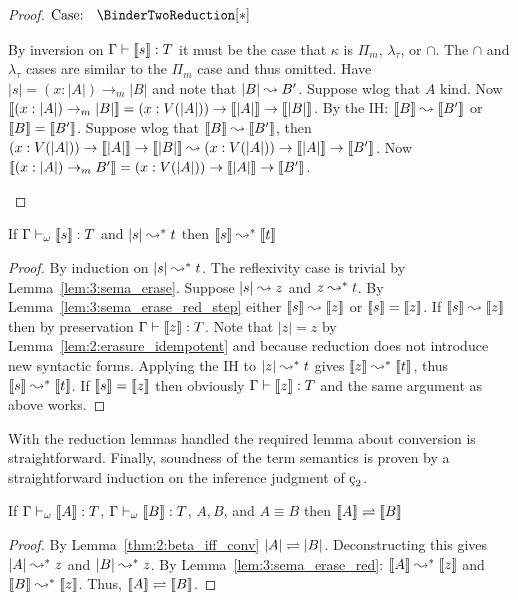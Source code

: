 \begin{proof}
    $\text{Case: }\begin{array}{c} \BinderTwoReduction[*] \end{array}$
    \begin{proofcase}
        By inversion on $\Gamma \vdash \llbracket s \rrbracket : T$ it must be the case that $\kappa$ is $\Pi_m$, $\lambda_\tau$, or $\cap$.
        The $\cap$ and $\lambda_\tau$ cases are similar to the $\Pi_m$ case and thus omitted.
        Have $|s| = (x : |A|) \to_m |B|$ and note that $|B| \leadsto B^\prime$.
        Suppose wlog that $A$ kind.
        Now $\llbracket (x : |A|) \to_m |B| \rrbracket = (x : V(|A|)) \to \llbracket |A| \rrbracket \to \llbracket |B| \rrbracket$.
        By the IH: $\llbracket B \rrbracket \leadsto \llbracket B^\prime \rrbracket$ or $\llbracket B \rrbracket = \llbracket B^\prime \rrbracket$.
        Suppose wlog that $\llbracket B \rrbracket \leadsto \llbracket B^\prime \rrbracket$, then $(x : V(|A|)) \to \llbracket |A| \rrbracket \to \llbracket |B| \rrbracket \leadsto (x : V(|A|)) \to \llbracket |A| \rrbracket \to \llbracket B^\prime \rrbracket$.
        Now $\llbracket (x : |A|) \to_m B^\prime \rrbracket = (x : V(|A|)) \to \llbracket |A| \rrbracket \to \llbracket B^\prime \rrbracket$.
    \end{proofcase}
\end{proof}

\begin{lemma}
    \label{lem:3:sema_erase_red}
    If $\Gamma \vdash_\omega \llbracket s \rrbracket : T$ and $|s| \leadsto^* t$ then $\llbracket s \rrbracket \leadsto^* \llbracket t \rrbracket$
\end{lemma}
\begin{proof}
    By induction on $|s| \leadsto^* t$.
    The reflexivity case is trivial by Lemma~\ref{lem:3:sema_erase}.
    Suppose $|s| \leadsto z$ and $z \leadsto^* t$.
    By Lemma~\ref{lem:3:sema_erase_red_step} either $\llbracket s \rrbracket \leadsto \llbracket z \rrbracket$ or $\llbracket s \rrbracket = \llbracket z \rrbracket$.
    If $\llbracket s \rrbracket \leadsto \llbracket z \rrbracket$ then by preservation $\Gamma \vdash \llbracket z \rrbracket : T$.
    Note that $|z| = z$ by Lemma~\ref{lem:2:erasure_idempotent} and because reduction does not introduce new syntactic forms.
    Applying the IH to $|z| \leadsto^* t$ gives $\llbracket z \rrbracket \leadsto^* \llbracket t \rrbracket$, thus $\llbracket s \rrbracket \leadsto^* \llbracket t \rrbracket$.
    If $\llbracket s \rrbracket = \llbracket z \rrbracket$ then obviously $\Gamma \vdash \llbracket z \rrbracket : T$ and the same argument as above works.
\end{proof}

With the reduction lemmas handled the required lemma about conversion is straightforward.
Finally, soundness of the term semantics is proven by a straightforward induction on the inference judgment of $\ced$.

\begin{lemma}
    \label{lem:3:sema_conv}
    If $\Gamma \vdash_\omega \llbracket A \rrbracket : T$, $\Gamma \vdash_\omega \llbracket B \rrbracket : T$, $A, B$\pseobj, and $A \equiv B$ then $\llbracket A \rrbracket \rightleftharpoons \llbracket B \rrbracket$
\end{lemma}
\begin{proof}
    By Lemma~\ref{thm:2:beta_iff_conv} $|A| \rightleftharpoons |B|$.
    Deconstructing this gives $|A| \leadsto^* z$ and $|B| \leadsto^* z$.
    By Lemma~\ref{lem:3:sema_erase_red}: $\llbracket A \rrbracket \leadsto^* \llbracket z \rrbracket$ and $\llbracket B \rrbracket \leadsto^* \llbracket z \rrbracket$.
    Thus, $\llbracket A \rrbracket \rightleftharpoons \llbracket B \rrbracket$.
\end{proof}

